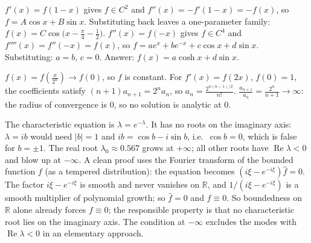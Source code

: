 \documentclass[11pt,a4paper]{article}
\begin{document}
 \(f'(x)=f(1-x)\) gives \(f\in C^2\) and \(f''(x)=-f'(1-x)=-f(x)\), so \(f=A\cos x+B\sin x\). Substituting back leaves a one-parameter family: \(f(x)=C\cos\bigl(x-\frac\pi4-\frac12\bigr)\).
 \(f''(x)=f(-x)\) gives \(f\in C^4\) and \(f''''(x)=f''(-x)=f(x)\), so \(f=ae^x+be^{-x}+c\cos x+d\sin x\). Substituting: \(a=b\), \(c=0\). Answer: \(f(x)=a\cosh x+d\sin x\).

 \(f(x)=f(\frac x{2^n})\to f(0)\), so \(f\) is constant.
 For \(f'(x)=f(2x)\), \(f(0)=1\), the coefficients satisfy \((n+1)a_{n+1}=2^na_n\), so \(a_n=\frac{2^{n(n-1)/2}}{n!}\).
 \(\frac{a_{n+1}}{a_n}=\frac{2^n}{n+1}\to\infty\): the radius of convergence is \(0\), so no solution is analytic at \(0\).

 The characteristic equation is \(\lambda=e^{-\lambda}\). It has no roots on the imaginary axis: \(\lambda=ib\) would need \(|b|=1\) and \(ib=\cos b-i\sin b\), i.e.\ \(\cos b=0\), which is false for \(b=\pm1\). The real root \(\lambda_0\approx0.567\) grows at \(+\infty\); all other roots have \(\operatorname{Re}\lambda\lt0\) and blow up at \(-\infty\).
 A clean proof uses the Fourier transform of the bounded function \(f\) (as a tempered distribution): the equation becomes \((i\xi-e^{-i\xi})\hat f=0\). The factor \(i\xi-e^{-i\xi}\) is smooth and never vanishes on \(\mathbb R\), and \(1/(i\xi-e^{-i\xi})\) is a smooth multiplier of polynomial growth; so \(\hat f=0\) and \(f\equiv0\).
 So boundedness on \(\mathbb R\) alone already forces \(f\equiv0\); the responsible property is that no characteristic root lies on the imaginary axis. The condition at \(-\infty\) excludes the modes with \(\operatorname{Re}\lambda\lt0\) in an elementary approach.
\end{document}
